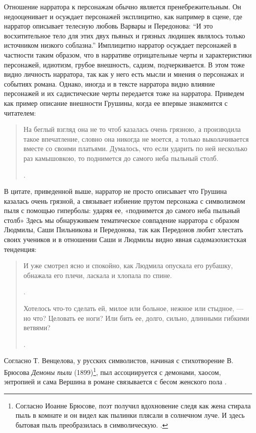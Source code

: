 \documentclass[12pt,a4paper]{article}
\begin{document}
Отношение нарратора к персонажам обычно является пренебрежительным. Он недооценивает и осуждает персонажей эксплицитно, как например в сцене, где нарратор описывает телесную любовь Варвары и Передонова: 
\enquote{И это восхитительное тело для этих двух пьяных и грязных людишек являлось только источником низкого соблазна.} \parencite[51.]{sologub2004} 
Имплицитно нарратор осуждает персонажей в частности таким образом, что в нарративе отрицательные черты и характеристики персонажей, идиотизм, грубое внешность, садизм, подчеркивается. В этом тоже видно личность нарратора, так как у него есть мысли и мнения о персонажах и событиях романа. Однако, иногда и в тексте нарратора видно влияние персонажей и их садистические черты передается тоже на нарратора. Приведем как пример описание внешности Грушины, когда ее впервые знакомится с читателем:

\begin{quote}
На беглый взгляд она не то
чтоб казалась очень грязною, а производила такое впечатление, словно
она никогда не моется, а только выколачивается вместе со своими 
платьями. Думалось, что если ударить по ней несколько раз камышовкою,
то поднимется до самого неба пыльный столб.

\parencite[33]{sologub2004}.
\end{quote}

В цитате, приведенной выше, нарратор не просто описывает что Грушина казалась очень грязной, а  связывает избиение прутом персонажа с символизмом пыля с помощью гиперболы: ударяя ее, «поднимется до самого неба пыльный столб» Здесь мы обнаруживаем тематическое совпадение нарратора с образом Людмилы, Саши Пильникова и Передонова, так как Передонов любит хлестать своих учеников и в отношении Саши и Людмилы видно явная садомазохистская тенденция:
\begin{quote}
И уже смотрел ясно и спокойно, как Людмила опускала его рубашку, обнажала его плечи, ласкала и хлопала по спине.

\parencite[208]{sologub2004}.

Хотелось что-то сделать ей, милое или больное, нежное или
стыдное, — но что? Целовать ее ноги? Или бить ее, долго, сильно, длинными гибкими ветвями?

\parencite[211]{sologub2004}.
\end{quote}

Согласно Т. Венцелова, у русских символистов, начиная с стихотворение В. Брюсова \emph{Демоны пыли} (1899)\footnote{ Согласно Иоанне Брюсове, поэт получил вдохновение следя как жена стирала пыль в комнате и он видел как пылинки плясали в солнечном луче. И здесь бытовая пыль преобразилась в символическую. \parencite[600]{brjusov1973}.}, пыл ассоциируется с демонами, хаосом, энтропией и сама Вершина в романе связывается с бесом женского пола \parencite[42--44]{venclova2012}. 
\end{document}
